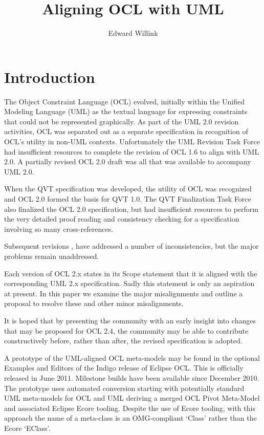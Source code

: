 \documentclass{eceasst}
\title{%
Aligning OCL with UML}
\author{%
Edward Willink\autref{1}}
\institute{%
\autlabel{1} \email{ed \_at\_ willink.me.uk}, \url{http://www.eclipse.org/modeling}\\
Eclipse Modeling Project}
\begin{document}
\maketitle
\section{Introduction}

The Object Constraint Language (OCL) evolved, initially within the Unified Modeling Language (UML) as the textual language for expressing constraints that could not be represented graphically. As part of the UML 2.0\cite{UML-2.0} revision activities, OCL was separated out as a separate specification in recognition of OCL's utility in non-UML contexts. Unfortunately the UML Revision Task Force had insufficient resources to complete the revision of OCL 1.6\cite{OCL-1.6} to align with UML 2.0. A partially revised OCL 2.0 draft\cite{OCL-2.0-draft} was all that was available to accompany UML 2.0.

When the QVT specification was developed, the utility of OCL was recognized and OCL 2.0\cite{OCL-2.0} formed the basis for QVT 1.0\cite{QVT-1.0}. The QVT Finalization Task Force also finalized the OCL 2.0 specification, but  had insufficient resources to perform the very detailed proof reading and consistency checking for a specification involving so many cross-references.

Subsequent revisions \cite{OCL-2.2},\cite{OCL-2.3} have addressed a number of  inconsistencies, but the major problems remain unaddressed.

Each version of OCL 2.x states in its Scope statement that it is aligned with the corresponding UML 2.x specification. Sadly this statement is only an aspiration at present. In this paper we examine the major misalignments and outline a proposal to resolve these and other minor misalignments.

It is hoped that by presenting the community with an early insight into changes that may be proposed for OCL 2.4, the community may be able to contribute constructively before, rather than after, the revised specification is adopted.

A prototype of the UML-aligned OCL meta-models may be found in the optional Examples and Editors of the Indigo release of Eclipse OCL\cite{MDT/OCL}. This is officially released in June 2011. Milestone builds have been available since December 2010. The prototype uses automated conversion starting with potentially standard UML meta-models for OCL and UML deriving a merged OCL Pivot Meta-Model and associated Eclipse Ecore\cite{EMF} tooling. Despite the use of Ecore tooling, with this approach the name of a meta-class is an OMG-compliant `Class' rather than the Ecore `EClass'. 
\end{document}
